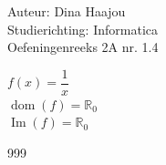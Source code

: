 \documentclass[a4paper]{article}
\begin{document}
   

\noindent \large Auteur: Dina Haajou \\
\noindent \large Studierichting: Informatica \\
\noindent \large Oefeningenreeks 2A nr. 1.4 \\

\medskip

\normalsize

$f(x) = \dfrac{1}{x}$ \\

$\operatorname{dom}(f) = \mathbb{R}_0$ \\

$\operatorname{Im}(f) = \mathbb{R}_0$

\begin{thebibliography}{999}
\end{thebibliography}
\end{document}

